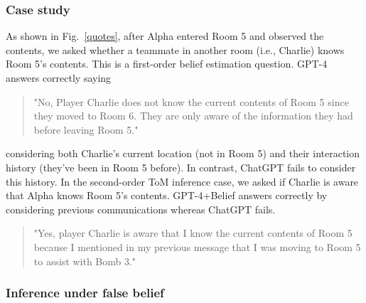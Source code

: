 \documentclass[11pt]{article}
\begin{document}
\subsubsection{Case study}

As shown in Fig.~\ref{quotes}, after Alpha entered Room 5 and observed the contents, we asked whether a teammate in another room (i.e., Charlie) knows Room 5's contents. This is a first-order belief estimation question. GPT-4 answers correctly saying 
\begin{quote}
"No, Player Charlie does not know the current contents of Room 5 since they moved to Room 6. They are only aware of the information they had before leaving Room 5."
\end{quote}
considering both Charlie's current location (not in Room 5) and their interaction history (they've been in Room 5 before). In contrast, ChatGPT fails to consider this history. In the second-order ToM inference case, we asked if Charlie is aware that Alpha knows Room 5's contents. GPT-4+Belief answers correctly by considering previous communications whereas ChatGPT fails.
\begin{quote}
"Yes, player Charlie is aware that I know the current contents of Room 5 because I mentioned in my previous message that I was moving to Room 5 to assist with Bomb 3."
\end{quote}



\subsubsection{Inference under false belief}
\end{document}
